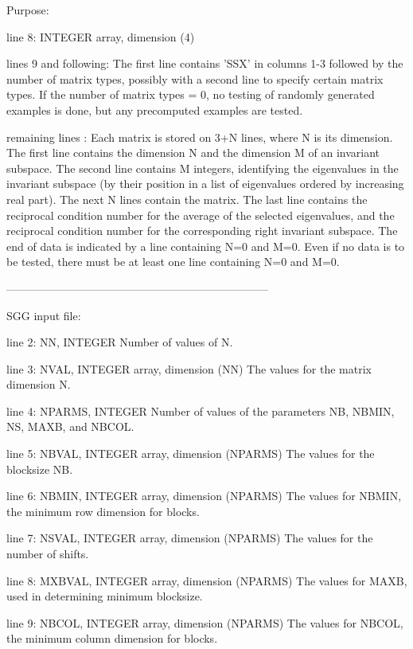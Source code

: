 \begin{DoxyParagraph}{Purpose\+: }
\begin{DoxyVerb}
 line 8:  INTEGER array, dimension (4)

 lines 9 and following: The first line contains 'SSX' in columns 1-3
          followed by the number of matrix types, possibly with
          a second line to specify certain matrix types.
          If the number of matrix types = 0, no testing of randomly
          generated examples is done, but any precomputed examples
          are tested.

 remaining lines : Each matrix is stored on 3+N lines, where N is its
          dimension. The first line contains the dimension N and the
          dimension M of an invariant subspace. The second line
          contains M integers, identifying the eigenvalues in the
          invariant subspace (by their position in a list of
          eigenvalues ordered by increasing real part). The next N
          lines contain the matrix. The last line contains the
          reciprocal condition number for the average of the selected
          eigenvalues, and the reciprocal condition number for the
          corresponding right invariant subspace. The end of data is
          indicated by a line containing N=0 and M=0. Even if no data
          is to be tested, there must be at least one line containing
          N=0 and M=0.

-----------------------------------------------------------------------

 SGG input file:

 line 2:  NN, INTEGER
          Number of values of N.

 line 3:  NVAL, INTEGER array, dimension (NN)
          The values for the matrix dimension N.

 line 4:  NPARMS, INTEGER
          Number of values of the parameters NB, NBMIN, NS, MAXB, and
          NBCOL.

 line 5:  NBVAL, INTEGER array, dimension (NPARMS)
          The values for the blocksize NB.

 line 6:  NBMIN, INTEGER array, dimension (NPARMS)
          The values for NBMIN, the minimum row dimension for blocks.

 line 7:  NSVAL, INTEGER array, dimension (NPARMS)
          The values for the number of shifts.

 line 8:  MXBVAL, INTEGER array, dimension (NPARMS)
          The values for MAXB, used in determining minimum blocksize.

 line 9:  NBCOL, INTEGER array, dimension (NPARMS)
          The values for NBCOL, the minimum column dimension for
          blocks.


\end{DoxyVerb}
\end{DoxyParagraph}
